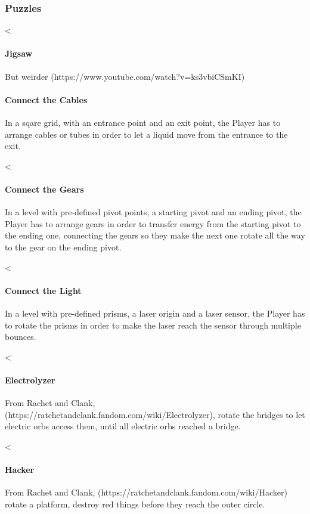 \subsubsection{Puzzles}

<\paragraph{Jigsaw} But weirder (https://www.youtube.com/watch?v=ks3vbiCSmKI)

\paragraph{Connect the Cables} In a sqare grid, with an entrance point and an exit point, the Player has to arrange cables or tubes in order to let a liquid move from the entrance to the exit.

<\paragraph{Connect the Gears} In a level with pre-defined pivot points, a starting pivot and an ending pivot, the Player has to arrange gears in order to transfer energy from the starting pivot to the ending one, connecting the gears so they make the next one rotate all the way to the gear on the ending pivot.

<\paragraph{Connect the Light} In a level with pre-defined prisms, a laser origin and a laser sensor, the Player has to rotate the prisms in order to make the laser reach the sensor through multiple bounces.

<\paragraph{Electrolyzer} From Rachet and Clank, (https://ratchetandclank.fandom.com/wiki/Electrolyzer), rotate the bridges to let electric orbs access them, until all electric orbs reached a bridge.


<\paragraph{Hacker} From Rachet and Clank, (https://ratchetandclank.fandom.com/wiki/Hacker) rotate a platform, destroy red things before they reach the outer circle.

